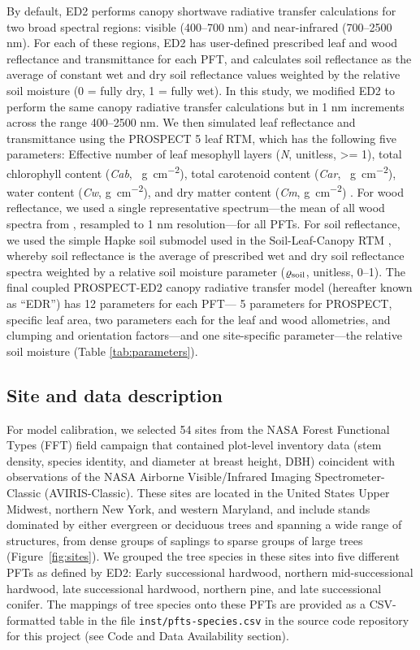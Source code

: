 By default, ED2 performs canopy shortwave radiative transfer calculations for two broad spectral regions: visible (400--700 \unit{nm}) and near-infrared (700--2500 \unit{nm}).
For each of these regions, ED2 has user-defined prescribed leaf and wood reflectance and transmittance for each PFT, and calculates soil reflectance as the average of constant wet and dry soil reflectance values weighted by the relative soil moisture (0 = fully dry, 1 = fully wet).
In this study, we modified ED2 to perform the same canopy radiative transfer calculations but in 1 \unit{nm} increments across the range 400--2500 \unit{nm}.
We then simulated leaf reflectance and transmittance using the PROSPECT 5 leaf RTM,
which has the following five parameters:
Effective number of leaf mesophyll layers (\emph{N}, unitless, >= 1),
total chlorophyll content (\emph{Cab}, \unit{\mu g ~ cm^{-2}}),
total carotenoid content (\emph{Car}, \unit{\mu g ~ cm^{-2}}),
water content (\emph{Cw}, \unit{g ~ cm^{-2}}),
and dry matter content (\emph{Cm}, \unit{g ~ cm^{-2}})
\citep{feret2008prospect4}.
For wood reflectance, we used a single representative spectrum---the mean of all wood spectra from \citet{asner1998biophysical}, resampled to 1 \unit{nm} resolution---for all PFTs.
For soil reflectance, we used the simple Hapke soil submodel used in the Soil-Leaf-Canopy RTM \citep{verhoef2007coupled}, whereby soil reflectance is the average of prescribed wet and dry soil reflectance spectra weighted by a relative soil moisture parameter ($\varrho_{\mathrm{soil}}$, unitless, 0--1).
The final coupled PROSPECT-ED2 canopy radiative transfer model (hereafter known as ``EDR'') has 12 parameters for each PFT---
5 parameters for PROSPECT, specific leaf area, two parameters each for the leaf and wood allometries, and clumping and orientation factors---and one site-specific parameter---the relative soil moisture (Table \ref{tab:parameters}).

\subsection{Site and data description}

For model calibration, we selected 54 sites from the NASA Forest Functional Types (FFT) field campaign that contained plot-level inventory data (stem density, species identity, and diameter at breast height, DBH) coincident with observations of the NASA Airborne Visible/Infrared Imaging Spectrometer-Classic (AVIRIS-Classic).
These sites are located in the United States Upper Midwest, northern New York, and western Maryland, and include stands dominated by either evergreen or deciduous trees and spanning a wide range of structures, from dense groups of saplings to sparse groups of large trees (Figure~\ref{fig:sites}).
We grouped the tree species in these sites into five different PFTs as defined by ED2:
Early successional hardwood, northern mid-successional hardwood, late successional hardwood, northern pine, and late successional conifer.
The mappings of tree species onto these PFTs are provided as a CSV-formatted table in the file \texttt{inst/pfts-species.csv} in the source code repository for this project (see Code and Data Availability section).

